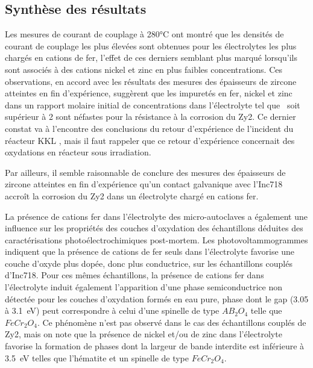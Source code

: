 \begin{refsection}
    \subsection{Synthèse des résultats}\label{subsec:ch4_summary_impurities}


    Les mesures de courant de couplage à 280°C ont montré que les densités de courant de couplage les plus élevées sont
    obtenues pour les électrolytes les plus chargés en cations de fer, l’effet de ces derniers semblant plus marqué
    lorsqu’ils sont associés à des cations nickel et zinc en plus faibles concentrations. Ces observations, en accord
    avec les résultats des mesures des épaisseurs de zircone atteintes en fin d’expérience, suggèrent que les impuretés
    en fer, nickel et zinc dans un rapport molaire initial de concentrations dans l’électrolyte tel que
    \ratio\ soit supérieur à 2 sont néfastes pour la résistance à la corrosion du Zy2. Ce dernier constat
    va à l’encontre des conclusions du retour d’expérience de l’incident du réacteur KKL \citep{Edsinger2004}, mais il faut rappeler que
    ce retour d’expérience concernait des oxydations en réacteur sous irradiation.

    Par ailleurs, il semble raisonnable de conclure des mesures des épaisseurs de zircone atteintes en fin d’expérience
    qu’un contact galvanique avec l’Inc718 accroît la corrosion du Zy2 dans un électrolyte chargé en cations fer. 
    
    La présence de cations fer dans l’électrolyte des micro-autoclaves a également une influence sur les propriétés des
    couches d’oxydation des échantillons déduites des caractérisations photoélectrochimiques post-mortem. Les
    photovoltammogrammes indiquent que la présence de cations de fer seuls dans l’électrolyte favorise une couche
    d’oxyde plus dopée, donc plus conductrice, sur les échantillons couplés d’Inc718. Pour ces mêmes échantillons, la
    présence de cations fer dans l’électrolyte induit également l’apparition d’une phase semiconductrice non détectée
    pour les couches d’oxydation formés en eau pure, phase dont le gap (3.05 à 3.1~eV) peut correspondre à celui d’une
    spinelle de type $AB_2O_4$ telle que $FeCr_2O_4$. Ce phénomène n’est pas observé dans le cas des échantillons couplés de
    Zy2, mais on note que la présence de nickel et/ou de zinc dans l’électrolyte favorise la formation de phases dont la
    largeur de bande interdite est inférieure à 3.5~eV telles que l’hématite et un spinelle de type $FeCr_2O_4$.
    

\end{refsection}
